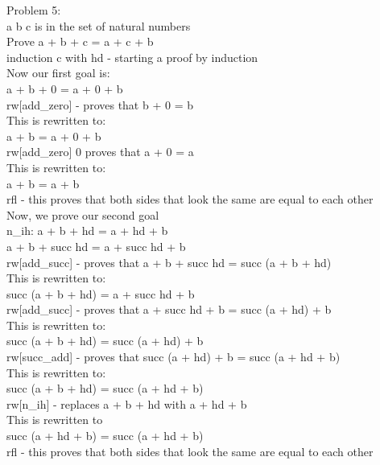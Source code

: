 \documentclass{article}
\theoremstyle{theorem}
\theoremstyle{definition}
\theoremstyle{remark}
\begin{document}
Problem 5:\\
a b c is in the set of natural numbers\\
Prove a + b + c = a + c + b\\
induction c with hd - starting a proof by induction\\
Now our first goal is:\\
a + b + 0 = a + 0 + b\\
rw[add\_zero] - proves that b + 0 = b\\
This is rewritten to:\\
a + b = a + 0 + b\\
rw[add\_zero] 0 proves that a + 0 = a\\
This is rewritten to:\\
a + b = a + b\\
rfl - this proves that both sides that look the same are equal to each other \\
Now, we prove our second goal\\
n\_ih: a + b + hd = a + hd + b\\
a + b + succ hd = a + succ hd + b\\
rw[add\_succ] - proves that a + b + succ hd = succ (a + b + hd)\\
This is rewritten to:\\
succ (a + b + hd) = a + succ hd + b\\
rw[add\_succ] - proves that a + succ hd + b = succ (a + hd) + b\\
This is rewritten to:\\
succ (a + b + hd) = succ (a + hd) + b\\
rw[succ\_add] - proves that succ (a + hd) + b = succ (a + hd + b)\\
This is rewritten to:\\
succ (a + b + hd) = succ (a + hd + b)\\
rw[n\_ih] - replaces a + b + hd with a + hd + b\\
This is rewritten to\\
succ (a + hd + b) = succ (a + hd + b)\\
rfl - this proves that both sides that look the same are equal to each other \\
\end{document}
